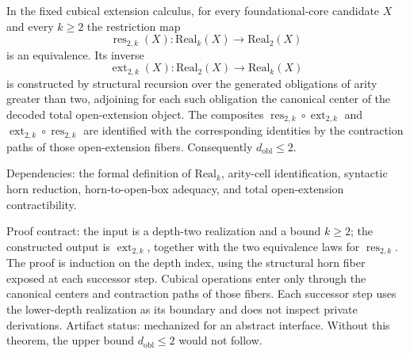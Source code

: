 \documentclass{lmcs}
\newcommand{\res}{\operatorname{res}}
\newcommand{\ext}{\operatorname{ext}}
\begin{document}
\begin{thm}
\label{thm:exact-stabilization}
In the fixed cubical extension calculus, for every foundational-core candidate \(X\) and
every \(k\geq 2\) the restriction map
\[
  \res_{2,k}(X):\mathrm{Real}_k(X)\longrightarrow\mathrm{Real}_2(X)
\]
is an equivalence.  Its inverse
\[
  \ext_{2,k}(X):\mathrm{Real}_2(X)\longrightarrow\mathrm{Real}_k(X)
\]
is constructed by structural recursion over the generated obligations of arity
greater than two, adjoining for each such obligation the canonical center of
the decoded total open-extension object.  The composites
\(\res_{2,k}\circ\ext_{2,k}\) and \(\ext_{2,k}\circ\res_{2,k}\) are identified
with the corresponding identities by the contraction paths of those
open-extension fibers.
Consequently \(d_{\mathrm{obl}}\leq 2\).

Dependencies: the formal definition of \(\mathrm{Real}_k\), arity-cell identification,
syntactic horn reduction, horn-to-open-box adequacy, and total open-extension
contractibility.

Proof contract: the input is a depth-two realization and a bound \(k\geq 2\);
the constructed output is \(\ext_{2,k}\), together with the two equivalence
laws for \(\res_{2,k}\).  The proof is induction on the depth index, using the
structural horn fiber exposed at each successor step.  Cubical operations enter
only through the canonical centers and contraction paths of those fibers.  Each
successor step uses the lower-depth realization as its boundary and does not
inspect private derivations.  Artifact status: mechanized for an abstract
interface.  Without this theorem, the upper bound \(d_{\mathrm{obl}}\leq 2\)
would not follow.
\end{thm}
\end{document}

